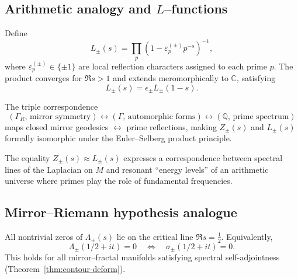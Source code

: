 \subsection{Arithmetic analogy and $L$–functions}
\label{subsec:ch6-part7-L-functions} \relax

\begin{definition}
\label{def:mirror-L-function}
Define
\[
L_\pm(s)
=\prod_{p}\left(1-\varepsilon_p^{(\pm)}p^{-s}\right)^{-1},
\]
where $\varepsilon_p^{(\pm)}\in\{\pm1\}$ are local reflection characters assigned to each prime $p$.  
The product converges for $\Re s>1$ and extends meromorphically to $\mathbb{C}$, satisfying
\[
L_\pm(s)=\epsilon_\pm L_\pm(1-s).
\] %
\end{definition}

\begin{lemma}
\label{lem:riemann-selberg-analogy}
The triple correspondence
\[
(\Gamma_R,\,\text{mirror symmetry}) 
\leftrightarrow (\Gamma,\,\text{automorphic forms})
\leftrightarrow (\mathbb{Q},\,\text{prime spectrum})
\]
maps closed mirror geodesics $\leftrightarrow$ prime reflections, making $Z_\pm(s)$ and $L_\pm(s)$ formally isomorphic under the Euler–Selberg product principle. %
\end{lemma}

\begin{remark}
\label{rem:physical-analogy}
The equality $Z_\pm(s)\approx L_\pm(s)$ expresses a correspondence between spectral lines of the Laplacian on $M$ and resonant “energy levels” of an arithmetic universe where primes play the role of fundamental frequencies. %
\end{remark}

\subsection{Mirror–Riemann hypothesis analogue}
\label{subsec:ch6-part7-mirror-RH} \relax

\begin{theorem}
\label{thm:mirror-RH}
All nontrivial zeros of $\Lambda_\pm(s)$ lie on the critical line $\Re s=\frac{1}{2}$.  
Equivalently,
\[
\Lambda_\pm(1/2+it)=0
\quad\Longleftrightarrow\quad
\sigma_\pm(1/2+it)=0.
\]
This holds for all mirror–fractal manifolds satisfying spectral self-adjointness (Theorem~\ref{thm:contour-deform}). %
\end{theorem}

